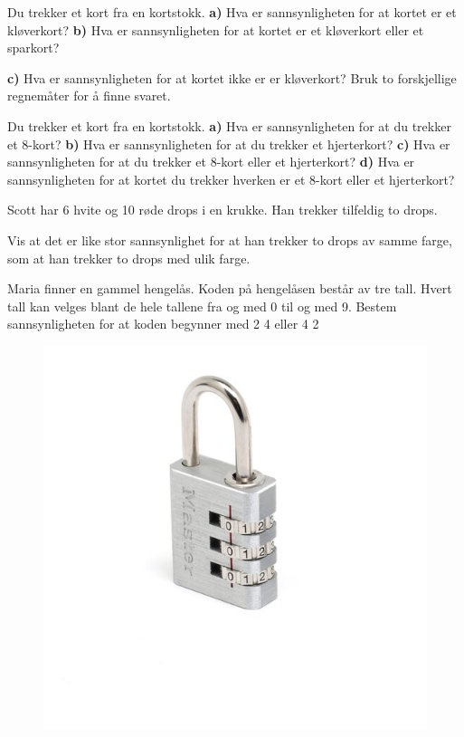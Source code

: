 




\opgt

\nes 

Du trekker et kort fra en kortstokk.\os
\textbf{a)} Hva er sannsynligheten for at kortet er et kløverkort?\os
\textbf{b)} Hva er sannsynligheten for at kortet er et kløverkort eller et sparkort?\os

\textbf{c)} Hva er sannsynligheten for at kortet ikke er er kløverkort? Bruk to forskjellige regnemåter for å finne svaret.

Du trekker et kort fra en kortstokk.\os
\textbf{a)} Hva er sannsynligheten for at du trekker et 8-kort?\os
\textbf{b)} Hva er sannsynligheten for at du trekker et hjerterkort?\os
\textbf{c)} Hva er sannsynligheten for at du trekker et 8-kort eller et hjerterkort?\os
\textbf{d)} Hva er sannsynligheten for at kortet du trekker hverken er et 8-kort eller et hjerterkort?

Scott har 6 hvite og 10 røde drops i en krukke.
Han trekker tilfeldig to drops.\os

Vis at det er like stor sannsynlighet for at han
trekker to drops av samme farge, som at han trekker to drops med ulik farge.

Maria finner en gammel hengelås. Koden på hengelåsen består av tre tall. Hvert tall
kan velges blant de hele tallene fra og med 0 til og med 9. \os
Bestem sannsynligheten for at koden begynner med 2 4 eller 4 2
\begin{figure}
	\centering
	\includegraphics[scale=0.65]{hengelas}
\end{figure}

